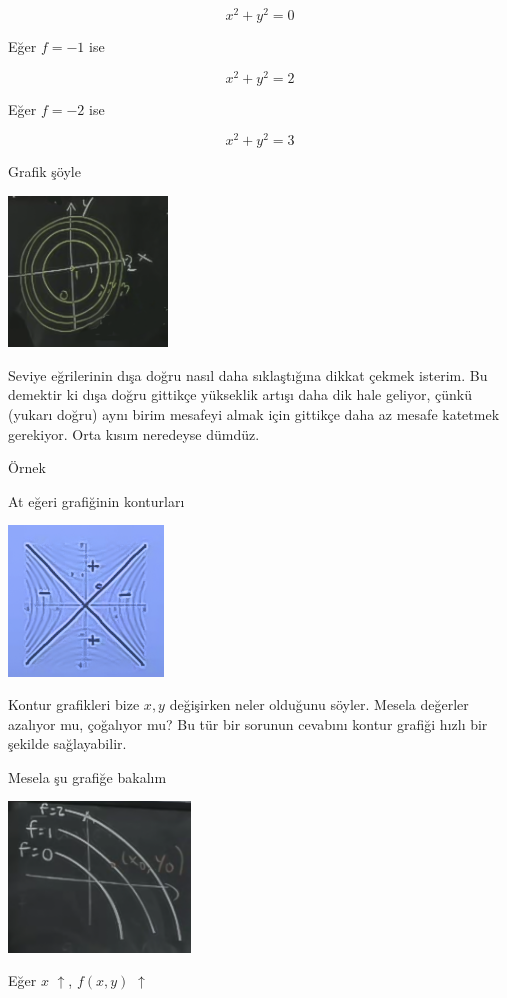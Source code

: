\documentclass[12pt,fleqn]{article}\usepackage{../../common}
\begin{document}
$$ x^2+y^2=0 $$

Eğer $f=-1$ ise

$$ x^2+y^2=2 $$

Eğer $f=-2$ ise

$$ x^2+y^2=3 $$

Grafik şöyle

\includegraphics[height=4cm]{8_12.png}

Seviye eğrilerinin dışa doğru nasıl daha sıklaştığına dikkat çekmek isterim. Bu
demektir ki dışa doğru gittikçe yükseklik artışı daha dik hale geliyor, çünkü
(yukarı doğru) aynı birim mesafeyi almak için gittikçe daha az mesafe katetmek
gerekiyor. Orta kısım neredeyse dümdüz.

Örnek

At eğeri grafiğinin konturları

\includegraphics[height=4cm]{8_13.png}

Kontur grafikleri bize $x,y$ değişirken neler olduğunu söyler. Mesela değerler
azalıyor mu, çoğalıyor mu? Bu tür bir sorunun cevabını kontur grafiği hızlı bir
şekilde sağlayabilir.

Mesela şu grafiğe bakalım

\includegraphics[height=4cm]{8_14.png}

Eğer $x$ $\uparrow$, $f(x,y)$ $\uparrow$
\end{document}

